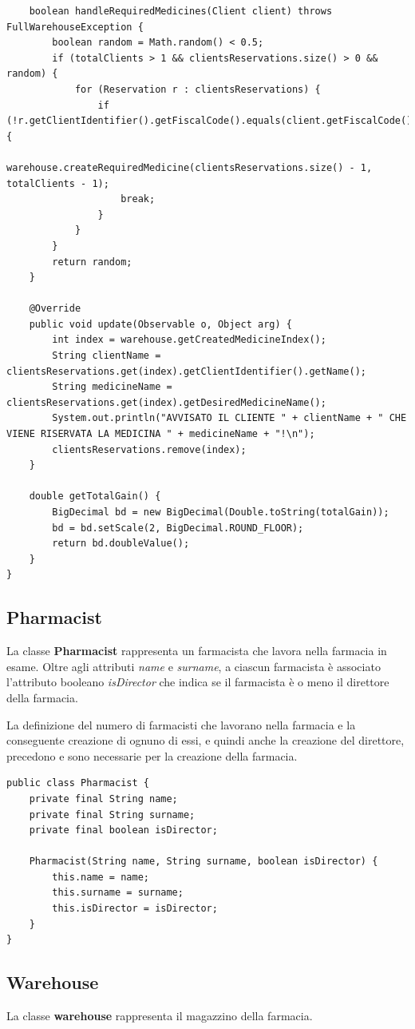 \documentclass[a4paper, 10pt]{report}
\begin{document}
\begin{lstlisting}
    boolean handleRequiredMedicines(Client client) throws FullWarehouseException {
        boolean random = Math.random() < 0.5;
        if (totalClients > 1 && clientsReservations.size() > 0 && random) {
            for (Reservation r : clientsReservations) {
                if (!r.getClientIdentifier().getFiscalCode().equals(client.getFiscalCode())) {
                    warehouse.createRequiredMedicine(clientsReservations.size() - 1, totalClients - 1);
                    break;
                }
            }
        }
        return random;
    }

    @Override
    public void update(Observable o, Object arg) {
        int index = warehouse.getCreatedMedicineIndex();
        String clientName = clientsReservations.get(index).getClientIdentifier().getName();
        String medicineName = clientsReservations.get(index).getDesiredMedicineName();
        System.out.println("AVVISATO IL CLIENTE " + clientName + " CHE VIENE RISERVATA LA MEDICINA " + medicineName + "!\n");
        clientsReservations.remove(index);
    }

    double getTotalGain() {
        BigDecimal bd = new BigDecimal(Double.toString(totalGain));
        bd = bd.setScale(2, BigDecimal.ROUND_FLOOR);
        return bd.doubleValue();
    }
}
\end{lstlisting}
\subsection{Pharmacist}
La classe \textbf{Pharmacist} rappresenta un farmacista che lavora nella farmacia in esame. Oltre agli attributi \textit{name} e \textit{surname}, a ciascun farmacista è associato l'attributo booleano \textit{isDirector} che indica se il farmacista è o meno il direttore della farmacia.

La definizione del numero di farmacisti che lavorano nella farmacia e la conseguente creazione di ognuno di essi, e quindi anche la creazione del direttore, precedono e sono necessarie per la creazione della farmacia.\\
\begin{lstlisting}
public class Pharmacist {
    private final String name;
    private final String surname;
    private final boolean isDirector;

    Pharmacist(String name, String surname, boolean isDirector) {
        this.name = name;
        this.surname = surname;
        this.isDirector = isDirector;
    }
}
\end{lstlisting}
\subsection{Warehouse}
La classe \textbf{warehouse} rappresenta il magazzino della farmacia. 
\end{document}
